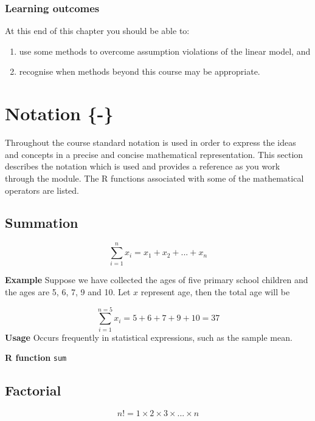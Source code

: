 \documentclass[
  oneside]{krantz}
\providecommand{\tightlist}{%
  \setlength{\itemsep}{0pt}\setlength{\parskip}{0pt}}
\begin{document}
\hypertarget{learning-outcomes-10}{%
\subsection{Learning outcomes}\label{learning-outcomes-10}}

At this end of this chapter you should be able to:

\begin{enumerate}
\def\labelenumi{\arabic{enumi}.}
\tightlist
\item
  use some methods to overcome assumption violations of the linear model, and
\item
  recognise when methods beyond this course may be appropriate.
\end{enumerate}

\hypertarget{notation}{%
\chapter{Notation \{-\}}\label{notation}}

Throughout the course standard notation is used in order to express the ideas and concepts in a precise and concise mathematical representation. This section describes the notation which is used and provides a reference as you work through the module. The R functions associated with some of the mathematical operators are listed.

\hypertarget{summation}{%
\section{Summation}\label{summation}}

\[\sum_{i=1} ^{n} x_i = x_1 + x_2 + ... + x_n\]

\textbf{Example} Suppose we have collected the ages of five primary school children and the ages are 5, 6, 7, 9 and 10. Let \(x\) represent age, then the total age will be

\[ \sum_{i=1}^{n=5}x_i = 5 + 6 + 7 + 9 + 10 = 37\]
\textbf{Usage} Occurs frequently in statistical expressions, such as the sample mean.

\textbf{R function} \texttt{sum}

\hypertarget{factorial}{%
\section{Factorial}\label{factorial}}

\[n! = 1 \times 2 \times 3 \times ... \times n\]
\end{document}
